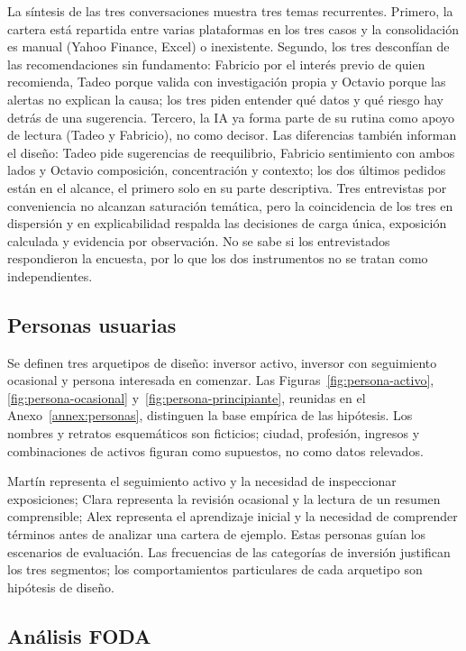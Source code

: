 La síntesis de las tres conversaciones muestra tres temas recurrentes. Primero, la cartera está repartida entre varias plataformas en los tres casos y la consolidación es manual (Yahoo Finance, Excel) o inexistente. Segundo, los tres desconfían de las recomendaciones sin fundamento: Fabricio por el interés previo de quien recomienda, Tadeo porque valida con investigación propia y Octavio porque las alertas no explican la causa; los tres piden entender qué datos y qué riesgo hay detrás de una sugerencia. Tercero, la IA ya forma parte de su rutina como apoyo de lectura (Tadeo y Fabricio), no como decisor. Las diferencias también informan el diseño: Tadeo pide sugerencias de reequilibrio, Fabricio sentimiento con ambos lados y Octavio composición, concentración y contexto; los dos últimos pedidos están en el alcance, el primero solo en su parte descriptiva. Tres entrevistas por conveniencia no alcanzan saturación temática, pero la coincidencia de los tres en dispersión y en explicabilidad respalda las decisiones de carga única, exposición calculada y evidencia por observación. No se sabe si los entrevistados respondieron la encuesta, por lo que los dos instrumentos no se tratan como independientes.

\subsection{Personas usuarias}\label{subsec:user-persona}

Se definen tres arquetipos de diseño: inversor activo, inversor con seguimiento ocasional y persona interesada en comenzar. Las Figuras~\ref{fig:persona-activo}, \ref{fig:persona-ocasional} y~\ref{fig:persona-principiante}, reunidas en el Anexo~\ref{annex:personas}, distinguen la base empírica de las hipótesis. Los nombres y retratos esquemáticos son ficticios; ciudad, profesión, ingresos y combinaciones de activos figuran como supuestos, no como datos relevados.

Martín representa el seguimiento activo y la necesidad de inspeccionar exposiciones; Clara representa la revisión ocasional y la lectura de un resumen comprensible; Alex representa el aprendizaje inicial y la necesidad de comprender términos antes de analizar una cartera de ejemplo. Estas personas guían los escenarios de evaluación. Las frecuencias de las categorías de inversión justifican los tres segmentos; los comportamientos particulares de cada arquetipo son hipótesis de diseño.

\subsection{Análisis FODA}\label{subsec:foda}

